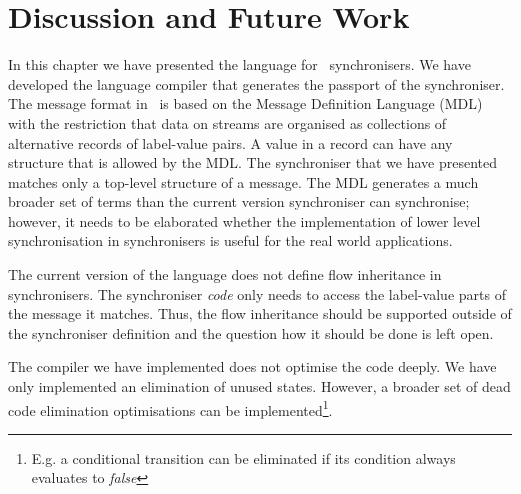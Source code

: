 \section{Discussion and Future Work}
In this chapter we have presented the language for \ak\ synchronisers. We have developed the language compiler that generates the passport of the synchroniser. The message format in \ak\ is based on the Message Definition Language (MDL) with the restriction that data on streams are organised as collections of alternative records of label-value pairs. A value in a record can have any structure that is allowed by the MDL. The synchroniser that we have presented matches only a top-level structure of a message. The MDL generates a much broader set of terms than the current version synchroniser can synchronise; however, it needs to be elaborated whether the implementation of lower level synchronisation in synchronisers is useful for the real world applications.

The current version of the language does not define flow inheritance in synchronisers. The synchroniser \emph{code} only needs to access the label-value parts of the message it matches. Thus, the flow inheritance should be supported outside of the synchroniser definition and the question how it should be done is left open.

The compiler we have implemented does not optimise the code deeply. We have only implemented an elimination of unused states. However, a broader set of dead code elimination optimisations can be implemented\footnote{E.g. a conditional transition can be eliminated if its condition always evaluates to \emph{false}}.

